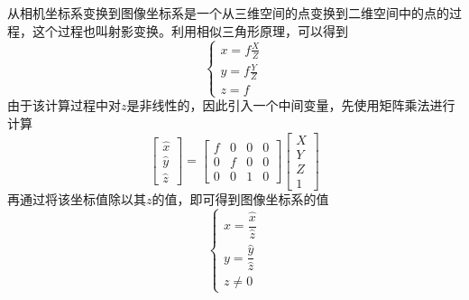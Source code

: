 从相机坐标系变换到图像坐标系是一个从三维空间的点变换到二维空间中的点的过程，这个过程也叫射影变换。利用相似三角形原理，可以得到
\begin{equation}
    \left\{
    \begin{array}{l}
        x = f\frac{X}{Z} \\
        y = f\frac{Y}{Z} \\
        z = f
    \end{array}\right.
\end{equation}
由于该计算过程中对\(z\)是非线性的，因此引入一个中间变量，先使用矩阵乘法进行计算
\begin{equation}
    \left[\begin{array}{c}\hat{x}\\\hat{y}\\\hat{z}\end{array}\right] =
    \left[\begin{array}{cccc}f&0&0&0\\0&f&0&0\\0&0&1&0\end{array}\right]
    \left[\begin{array}{c}X\\Y\\Z\\1\end{array}\right]
\end{equation}
再通过将该坐标值除以其\(z\)的值，即可得到图像坐标系的值
\begin{equation}
    \left\{\begin{array}{l}x=\dfrac{\hat{x}}{\hat{z}} \\y=\dfrac{\hat{y}}{\hat{z}}
        \\z\ne0\end{array}\right.
\end{equation}

